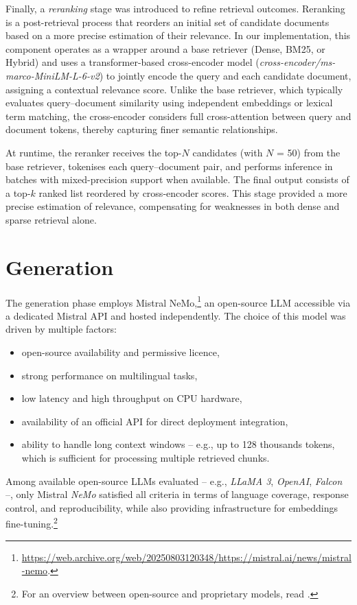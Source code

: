 \begin{spacing}{1.5}
Finally, a \textit{reranking} stage was introduced to refine retrieval outcomes. Reranking is a post-retrieval process that reorders an initial set of candidate documents based on a more precise estimation of their relevance. In our implementation, this component operates as a wrapper around a base retriever (Dense, BM25, or Hybrid) and uses a transformer-based cross-encoder model (\textit{cross-encoder/ms-marco-MiniLM-L-6-v2}) to jointly encode the query and each candidate document, assigning a contextual relevance score. Unlike the base retriever, which typically evaluates query–document similarity using independent embeddings or lexical term matching, the cross-encoder considers full cross-attention between query and document tokens, thereby capturing finer semantic relationships.

At runtime, the reranker receives the top-$N$ candidates (with $N$ = 50) from the base retriever, tokenises each query–document pair, and performs inference in batches with mixed-precision support when available. The final output consists of a top-$k$ ranked list reordered by cross-encoder scores. This stage provided a more precise estimation of relevance, compensating for weaknesses in both dense and sparse retrieval alone.


\section{Generation}
The generation phase employs Mistral NeMo,\footnote{\url{https://web.archive.org/web/20250803120348/https://mistral.ai/news/mistral-nemo}.\nocite{noauthor_mistral_2025}} an open-source LLM accessible via a dedicated Mistral API and hosted independently. The choice of this model was driven by multiple factors:
\begin{itemize}
      \item open-source availability and permissive licence,
      \item strong performance on multilingual tasks,
      \item low latency and high throughput on CPU hardware,
      \item availability of an official API for direct deployment integration,
      \item ability to handle long context windows -- e.g., up to 128 thousands tokens, which is sufficient for processing multiple retrieved chunks.
\end{itemize}

Among available open-source LLMs evaluated -- e.g., \textit{LLaMA 3}, \textit{OpenAI}, \textit{Falcon} --, only Mistral \textit{NeMo} satisfied all criteria in terms of language coverage, response control, and reproducibility, while also providing infrastructure for embeddings fine-tuning.\footnote{For an overview between open-source and proprietary models, read \textcite{noauthor_open_2025}.}


\end{spacing}
